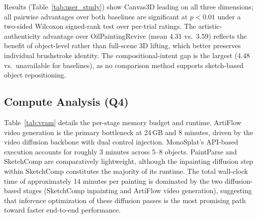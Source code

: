 Results (Table~\ref{tab:user_study}) show Canvas3D leading on all
three dimensions; all pairwise advantages over both baselines are
significant at $p < 0.01$ under a two-sided Wilcoxon signed-rank test
over per-trial ratings. The artistic-authenticity advantage over
OilPaintingRevive (mean 4.31 vs.\ 3.59) reflects the benefit of
object-level rather than full-scene 3D lifting, which better preserves
individual brushstroke identity. The compositional-intent gap is the
largest (4.48 vs.\ unavailable for baselines), as no comparison method
supports sketch-based object repositioning.

\begin{table}[t]
\centering
\caption{\textbf{User study} (Likert 1--5, mean $\pm$ std). N/A:
cannot accept line-art composition input.}
\label{tab:user_study}
\end{table}

\subsection{Compute Analysis (Q4)}

Table~\ref{tab:vram} details the per-stage memory budget and runtime.
ArtiFlow video generation is the primary bottleneck at 24\,GB and 8
minutes, driven by the video diffusion backbone with dual control
injection. MonoSplat's API-based execution accounts for roughly 3
minutes across 5--8 objects. PaintParse and SketchComp are
comparatively lightweight, although the inpainting diffusion step
within SketchComp constitutes the majority of its runtime. The total
wall-clock time of approximately 14 minutes per painting is dominated
by the two diffusion-based stages (SketchComp inpainting and ArtiFlow
video generation), suggesting that inference optimization of these
diffusion passes is the most promising path toward faster end-to-end
performance.

